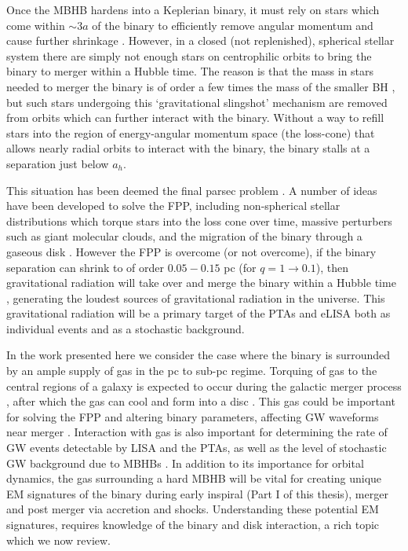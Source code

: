Once the MBHB hardens into a Keplerian binary, it must rely on stars which
come within $\sim3a$ of the binary to efficiently remove angular momentum and
cause further shrinkage \citep{Saslaw:1974}. However, in a closed (not
replenished),  spherical stellar system there are simply not enough stars on
centrophilic orbits to bring the binary to merger within a Hubble time. The
reason is that the mass in stars needed to merger the binary is of order a few
times the mass of the smaller BH \citep{MerrittMilos:2005:LRR}, but such stars undergoing this
`gravitational slingshot' mechanism are removed from orbits which can further
interact with the binary. Without a way to refill stars into the region of
energy-angular momentum space (the loss-cone) that allows nearly radial orbits
to interact with the binary, the binary stalls at a separation just below
$a_h$.

This situation has been deemed the final parsec problem
\citep[FPP][]{Milosavljevic:2003:FPcP}. A number of ideas have been developed
to solve the FPP, including non-spherical stellar distributions which torque
stars into the loss cone over time, massive perturbers such as giant molecular
clouds, and the migration of the binary through a gaseous disk
\citep{Goicovic:2016, GouldRix:2000, ArmNat:2002:ApJL}.  However the FPP is
overcome (or not overcome), if the binary separation can shrink to of order
$0.05-0.15$ pc (for $q=1 \rightarrow 0.1$), then gravitational radiation will
take over and merge the binary within a Hubble time \citep{Peters64},
generating the loudest sources of gravitational radiation in the universe.
This gravitational radiation will be a primary target of the PTAs and eLISA
both as individual events and as a stochastic background.

In the work presented here we consider the case where the binary is surrounded
by an ample supply of gas in the pc to sub-pc regime. Torquing of gas to the
central regions of a galaxy is expected to occur during the galactic merger
process \citep{BH1992, Barnes:1996}, after which the gas can cool and form
into a disc \citep{Barnes:2002}. This gas could be important for solving the
FPP and altering binary parameters, affecting GW waveforms near merger
\citep[\textit{e.g.}][]{ArmNat:2005, YKH:2011:L, RoedigSesana:2012:eccGWs}.
Interaction with gas is also important for determining the rate of GW events
detectable by LISA and the PTAs, as well as the level of stochastic GW
background due to MBHBs \citep{KocsisSesana:2011, Shannon:2015,
Sesana+2016:GWB, EPTA:GWB:2015, Arzoumanian:2015:SGWB}. In addition to its
importance for orbital dynamics, the gas surrounding a hard MBHB will be vital
for creating unique EM signatures of the binary during early inspiral (Part I
of this thesis), merger \citep{Chang:2010, Baruteau:2012,
CerioliLodato:Squeeze:2016} and post merger \citep{Lippai:2008, Lia10,
Rossi:2010, Ponce:2012, Rosotti:2012, Zanotti:2012} via accretion and shocks.
Understanding these potential EM signatures, requires knowledge of the binary
and disk interaction, a rich topic which we now review.





